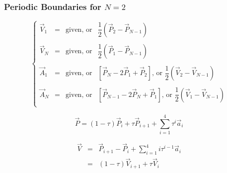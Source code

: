 \documentclass[aps,12pt]{revtex4}
\begin{document}
\subsubsection{Periodic Boundaries for $N=2$}
\begin{equation}
\left\lbrace
\begin{array}{rcll}
\vec{V}_1 & = & \text{given, or} & \dfrac{1}{2}\left(\vec{P}_2 - \vec{P}_{N-1}\right)\\ 
\\
\vec{V}_N & = & \text{given, or} & \dfrac{1}{2}\left(\vec{P}_1 - \vec{P}_{N-1}\right)\\
\\
\vec{A}_1 & = & \text{given, or} &   \left[\vec{P}_{N} - 2\vec{P}_{1} + \vec{P}_2\right]  \text{, or } \dfrac{1}{2}\left(\vec{V}_2 - \vec{V}_{N-1}\right)\\ 
\\
\vec{A}_N & = & \text{given, or} &    \left[\vec{P}_{N-1} - 2\vec{P}_N + \vec{P}_1\right] \text{, or }  \dfrac{1}{2}\left(\vec{V}_1 - \vec{V}_{N-1}\right)\\ 
\end{array} 
\right.
\end{equation}

\begin{equation}
\vec{P} = (1-\tau) \vec{P}_{i} + \tau \vec{P}_{i+1} + \sum_{i=1}^4 \tau^i\vec{a}_i 
\end{equation}

\begin{equation}
\begin{array}{rcl}
\vec{V} & = & \vec{P}_{i+1} - \vec{P}_i + \sum_{i=1}^4 i\tau^{i-1}\vec{a}_i \\
& = & (1-\tau) \vec{V}_{i+1} + \tau \vec{V}_{i}\\
\end{array}
\end{equation}
\end{document}
